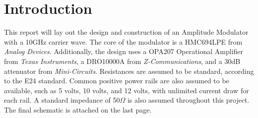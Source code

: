 \section{Introduction}

This report will lay out the design and construction of an Amplitude Modulator with a 10GHz carrier wave. The core of the modulator is a HMC694LPE from \textit{Analog Devices}. Additionally, the design uses a OPA207 Operational Amplifier from \textit{Texas Instruments}, a DRO10000A from \textit{Z-Communications}, and a 30dB attenuator from \textit{Mini-Circuits}. Resistances are assumed to be standard, according to the E24 standard. Common positive power rails are also assumed to be available, such as 5 volts, 10 volts, and 12 volts, with unlimited current draw for each rail. A standard impedance of 50$\Omega$ is also assumed throughout this project.
\\

The final schematic is attached on the last page. 